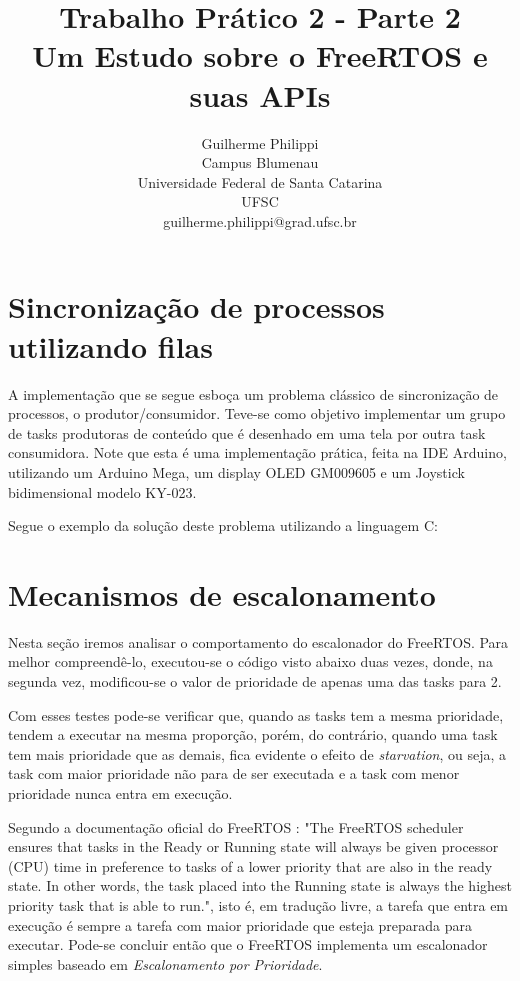 \documentclass[a4paper,12pt]{article}
\title{Trabalho Prático 2 - Parte 2\\ Um Estudo sobre o FreeRTOS e suas APIs}
\author{Guilherme Philippi\\Campus Blumenau\\Universidade Federal de Santa Catarina\\UFSC
	\\guilherme.philippi@grad.ufsc.br}
\begin{document}
	\maketitle
	\tableofcontents
	
	\section{Sincronização de processos utilizando filas}
	A implementação que se segue esboça um problema clássico de sincronização de processos, o produtor/consumidor. Teve-se como objetivo implementar um grupo de tasks produtoras de conteúdo que é desenhado em uma tela por outra task consumidora. Note que esta é uma implementação prática, feita na IDE Arduino, utilizando um Arduino Mega, um display OLED GM009605 e um Joystick bidimensional modelo KY-023.
	
	Segue o exemplo da solução deste problema utilizando a linguagem C:
	\lstset{numbers=left,basicstyle=\footnotesize, numberstyle=\tiny, stepnumber=1, numbersep=5pt, showstringspaces=false}
	
	
	\section{Mecanismos de escalonamento}
	Nesta seção iremos analisar o comportamento do escalonador do FreeRTOS. Para melhor compreendê-lo, executou-se o código visto abaixo duas vezes, donde, na segunda vez, modificou-se o valor de prioridade de apenas uma das tasks para 2.
	
	
	
	Com esses testes pode-se verificar que, quando as tasks tem a mesma prioridade, tendem a executar na mesma proporção, porém, do contrário, quando uma task tem mais prioridade que as demais, fica evidente o efeito de \textit{starvation}, ou seja, a task com maior prioridade não para de ser executada e a task com menor prioridade nunca entra em execução.
	
	Segundo a documentação oficial do FreeRTOS \cite{barry2009freertos}: "The FreeRTOS scheduler ensures that tasks in the Ready or Running state will always be given processor (CPU) time in preference to tasks of a lower priority that are also in the ready state. In other words, the task placed into the Running state is always the highest priority task that is able to run.", isto é, em tradução livre, a tarefa que entra em execução é sempre a tarefa com maior prioridade que esteja preparada para executar. Pode-se concluir então que o FreeRTOS implementa um escalonador simples baseado em \textit{Escalonamento por Prioridade}.
	
\end{document}
